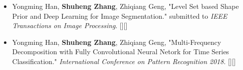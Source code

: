 %
%



\begin{itemize}
	\item Yongming Han, \textbf{Shuheng Zhang}, Zhiqiang Geng, "Level Set based Shape Prior and Deep Learning for Image Segmentation." submitted to \emph{IEEE Transactions on Image Processing}. [\href{https://github.com/zsh965866221/LevelSet-ShapePrior-DeepLearning}{\color{blue}{Github}}][\href{https://github.com/zsh965866221/LevelSet-ShapePrior-DeepLearning/raw/master/2018-06-22-Level\%20Set\%20based\%20Shape\%20Prior\%20and\%20Deep\%20Learning\%20for\%20Image\%20Segmentation.pdf}{\color{blue}{{\color{blue}{pdf}}}}] \\
	 { \footnotesize {}}
	\item Yongming Han, \textbf{Shuheng Zhang}, Zhiqiang Geng, "Multi-Frequency Decomposition with Fully Convolutional Neural Netork for Time Series Classification." \emph{International Conference on Pattern Recognition 2018}. [\href{https://github.com/zsh965866221/MFD-FCN}{\color{blue}{Github}}][\href{https://github.com/zsh965866221/MFD-FCN/raw/master/MFD-FCN_paper.pdf}{\color{blue}{pdf}}]\\
	 { \footnotesize {}}
\end{itemize}